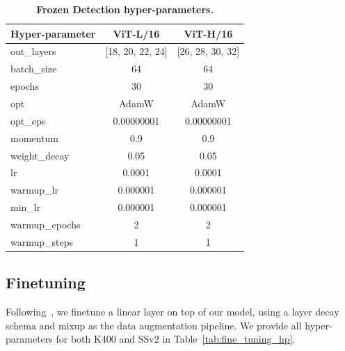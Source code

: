 \documentclass[twocolumn]{fairmeta}
\theoremstyle{plain}
\theoremstyle{definition}
\theoremstyle{remark}
\begin{document}
\begin{table}
    \centering
    \caption{\bf\small Frozen Detection hyper-parameters.}
    \label{tab:ava}
    {\fontsize{9pt}{9pt}\selectfont
    \setlength{\tabcolsep}{2pt}
    \begin{tabular}{@{} l c c @{}}
        \toprule
        Hyper-parameter & ViT-L/16 & ViT-H/16 \\\midrule
        out\_layers & [18, 20, 22, 24] & [26, 28, 30, 32] \\
        batch\_size & 64 & 64 \\
        epochs & 30 & 30\\
        opt & AdamW & AdamW \\
        opt\_eps & 0.00000001 & 0.00000001 \\
        momentum & 0.9 & 0.9 \\
        weight\_decay & 0.05 & 0.05 \\
        lr & 0.0001 & 0.0001 \\
        warmup\_lr & 0.000001 & 0.000001 \\
        min\_lr & 0.000001 & 0.000001 \\
        warmup\_epochs & 2 & 2 \\
        warmup\_steps & 1 & 1 \\
        \bottomrule
    \end{tabular}}
\end{table}


\subsection{Finetuning}

Following~\citet{tong2022videomae}, we finetune a linear layer on top of our model, using a layer decay schema and mixup as the data augmentation pipeline. We provide all hyper-parameters for both K400 and SSv2 in Table~\ref{tab:fine_tuning_hp}.
\end{document}
